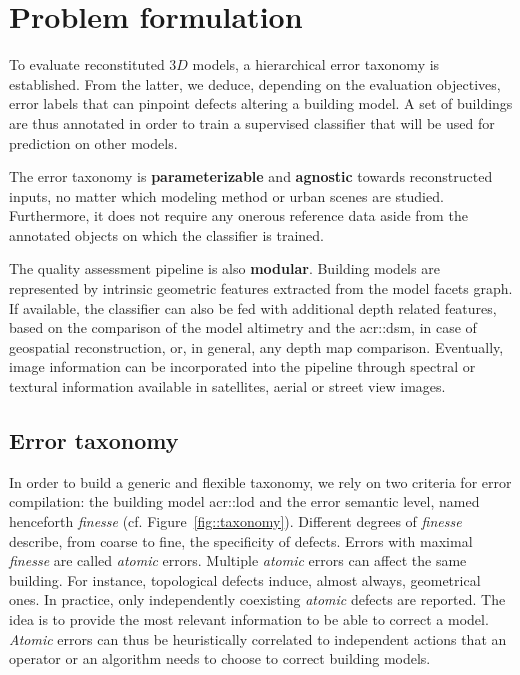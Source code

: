 \documentclass[runningheads]{llncs}
\begin{document}
\section{Problem formulation}
\label{sec:approach}
To evaluate reconstituted $3D$ models, a hierarchical error taxonomy is established. From the latter, we deduce, depending on the evaluation objectives,
error labels that can pinpoint defects altering a building model. A set of buildings are thus annotated in order to train a supervised classifier that will be used for prediction on other models.

The error taxonomy is \textbf{parameterizable} and \textbf{agnostic} towards reconstructed inputs, no matter which modeling method or urban scenes are studied. Furthermore, it does not require any onerous reference data aside from the annotated objects on which the classifier is trained.

The quality assessment pipeline is also \textbf{modular}. Building models are represented by intrinsic geometric features extracted from the model facets graph. If available, the classifier can also be fed with additional depth related features, based on the comparison of the model altimetry and the \acrshort{acr::dsm}, in case of geospatial reconstruction, or, in general, any depth map comparison. Eventually, image information can be incorporated into the pipeline through spectral or textural information available in satellites, aerial or street view images.

\subsection{Error taxonomy}
In order to build a generic and flexible taxonomy, we rely on two criteria for error compilation: the building model \acrshort{acr::lod} and the error semantic level, named henceforth \textit{finesse} (cf. Figure~\ref{fig::taxonomy}). Different degrees of \textit{finesse} describe, from coarse to fine, the specificity of defects. Errors with maximal \textit{finesse} are called \textit{atomic} errors. Multiple \textit{atomic} errors can affect the same building. For instance, topological defects induce, almost always, geometrical ones. In practice, only independently coexisting \textit{atomic} defects are reported. The idea is to provide the most relevant information to be able to correct a model. \textit{Atomic} errors can thus be heuristically correlated to independent actions that an operator or an algorithm needs to choose to correct building models.
\end{document}
